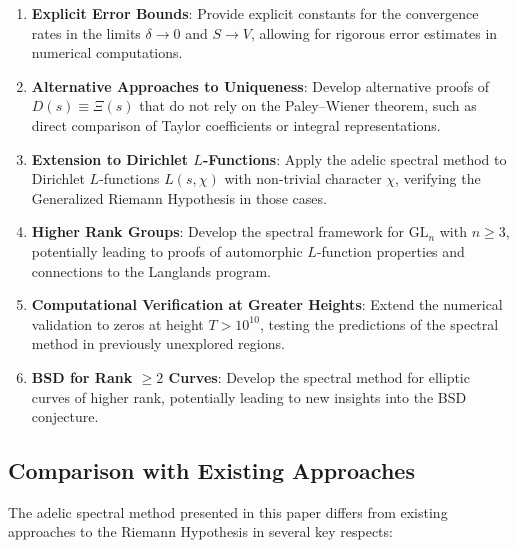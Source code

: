 \begin{enumerate}
\item \textbf{Explicit Error Bounds}: Provide explicit constants for the convergence rates in the limits $\delta \to 0$ and $S \to V$, allowing for rigorous error estimates in numerical computations.

\item \textbf{Alternative Approaches to Uniqueness}: Develop alternative proofs of $D(s) \equiv \Xi(s)$ that do not rely on the Paley–Wiener theorem, such as direct comparison of Taylor coefficients or integral representations.

\item \textbf{Extension to Dirichlet $L$-Functions}: Apply the adelic spectral method to Dirichlet $L$-functions $L(s, \chi)$ with non-trivial character $\chi$, verifying the Generalized Riemann Hypothesis in those cases.

\item \textbf{Higher Rank Groups}: Develop the spectral framework for $\mathrm{GL}_n$ with $n \geq 3$, potentially leading to proofs of automorphic $L$-function properties and connections to the Langlands program.

\item \textbf{Computational Verification at Greater Heights}: Extend the numerical validation to zeros at height $T > 10^{10}$, testing the predictions of the spectral method in previously unexplored regions.

\item \textbf{BSD for Rank $\geq 2$ Curves}: Develop the spectral method for elliptic curves of higher rank, potentially leading to new insights into the BSD conjecture.
\end{enumerate}

\subsection{Comparison with Existing Approaches}

The adelic spectral method presented in this paper differs from existing approaches to the Riemann Hypothesis in several key respects:

